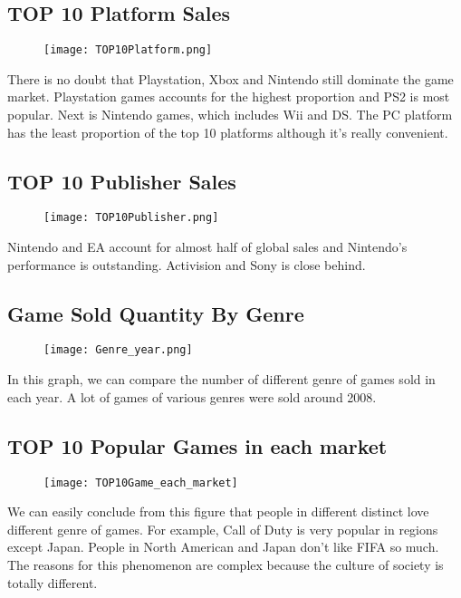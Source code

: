 \documentclass{article}
\begin{document}
	\subsection{TOP 10 Platform Sales}
		\begin{figure}[htbp]
		\centering
		\texttt{[image: TOP10Platform.png]}
		\end{figure}
	There is no doubt that Playstation, Xbox and Nintendo still dominate the game market. Playstation games accounts for the highest proportion and PS2 is most popular. Next is Nintendo games, which includes Wii and DS. The PC platform has the least proportion of the top 10 platforms although it's really convenient.
	
	\newpage
	\subsection{TOP 10 Publisher Sales}
	\begin{figure}[htbp]
		\centering
		\texttt{[image: TOP10Publisher.png]}
	\end{figure}
	Nintendo and EA account for almost half of global sales and Nintendo's performance is outstanding. Activision and Sony is close behind.
	
	\subsection{Game Sold Quantity By Genre}
	\begin{figure}[htbp]
		\centering
		\texttt{[image: Genre\_year.png]}
	\end{figure}
	In this graph, we can compare the number of different genre of games sold in each year. A lot of games of various genres were sold around 2008.
	
	\newpage
	\subsection{TOP 10 Popular Games in each market}
	\begin{figure}[htbp]
		\centering
		\texttt{[image: TOP10Game\_each\_market]}
	\end{figure}
	We can easily conclude from this figure that people in different distinct love different genre of games. For example, Call of Duty is very popular in regions except Japan. People in North American and Japan don't like FIFA so much. The reasons for this phenomenon are complex because the culture of society is totally different. 
	
	

	
\end{document}
